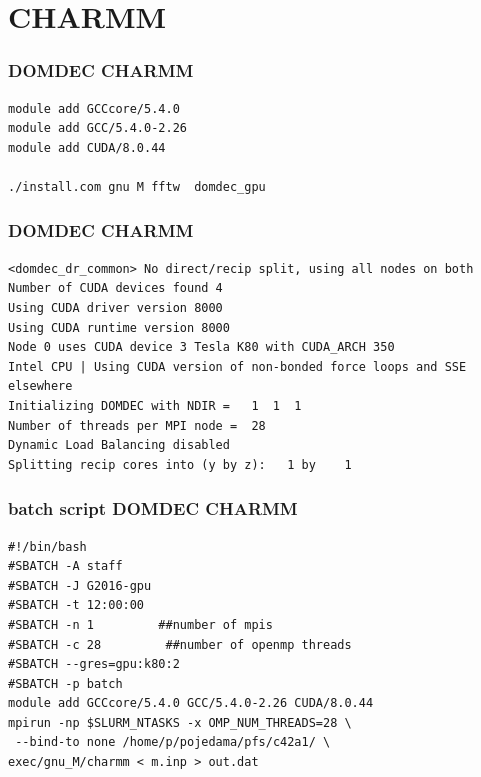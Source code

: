 \section{CHARMM}
\begin{frame}[fragile]
	\frametitle{DOMDEC CHARMM}
  
        \begin{verbatim}             
module add GCCcore/5.4.0    
module add GCC/5.4.0-2.26   
module add CUDA/8.0.44

./install.com gnu M fftw  domdec_gpu
        \end{verbatim}

\end{frame}

\begin{frame}[fragile]
	\frametitle{DOMDEC CHARMM}
  
        \begin{verbatim}             
<domdec_dr_common> No direct/recip split, using all nodes on both                                                                                                                               
Number of CUDA devices found 4
Using CUDA driver version 8000
Using CUDA runtime version 8000
Node 0 uses CUDA device 3 Tesla K80 with CUDA_ARCH 350
Intel CPU | Using CUDA version of non-bonded force loops and SSE elsewhere
Initializing DOMDEC with NDIR =   1  1  1  
Number of threads per MPI node =  28 
Dynamic Load Balancing disabled
Splitting recip cores into (y by z):   1 by    1
        \end{verbatim}

\end{frame}

\begin{frame}[fragile]
	\frametitle{batch script DOMDEC CHARMM}
  
        \begin{verbatim}             
#!/bin/bash
#SBATCH -A staff
#SBATCH -J G2016-gpu
#SBATCH -t 12:00:00
#SBATCH -n 1         ##number of mpis
#SBATCH -c 28         ##number of openmp threads
#SBATCH --gres=gpu:k80:2
#SBATCH -p batch
module add GCCcore/5.4.0 GCC/5.4.0-2.26 CUDA/8.0.44   
mpirun -np $SLURM_NTASKS -x OMP_NUM_THREADS=28 \
 --bind-to none /home/p/pojedama/pfs/c42a1/ \
exec/gnu_M/charmm < m.inp > out.dat
        \end{verbatim}

\end{frame}



